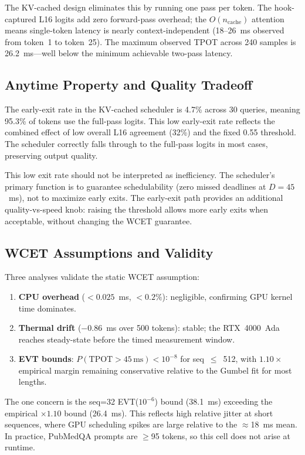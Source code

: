 \documentclass[conference]{IEEEtran}
\begin{document}
The KV-cached design eliminates this by running one pass per token. The hook-captured L16 logits add zero forward-pass overhead; the $O(n_{\text{cache}})$ attention means single-token latency is nearly context-independent (18--26~ms observed from token~1 to token~25). The maximum observed TPOT across 240 samples is 26.2~ms---well below the minimum achievable two-pass latency.

\subsection{Anytime Property and Quality Tradeoff}

The early-exit rate in the KV-cached scheduler is 4.7\% across 30 queries, meaning 95.3\% of tokens use the full-pass logits. This low early-exit rate reflects the combined effect of low overall L16 agreement (32\%) and the fixed 0.55 threshold. The scheduler correctly falls through to the full-pass logits in most cases, preserving output quality.

This low exit rate should not be interpreted as inefficiency. The scheduler's primary function is to guarantee schedulability (zero missed deadlines at $D = 45$~ms), not to maximize early exits. The early-exit path provides an additional quality-vs-speed knob: raising the threshold allows more early exits when acceptable, without changing the WCET guarantee.

\subsection{WCET Assumptions and Validity}

Three analyses validate the static WCET assumption:
\begin{enumerate}[leftmargin=*]
    \item \textbf{CPU overhead} ($<0.025$~ms, $<0.2\%$): negligible, confirming GPU kernel time dominates.
    \item \textbf{Thermal drift} ($-0.86$~ms over 500 tokens): stable; the RTX~4000~Ada reaches steady-state before the timed measurement window.
    \item \textbf{EVT bounds}: $P(\text{TPOT} > 45\,\text{ms}) < 10^{-8}$ for seq~$\leq$~512, with $1.10\times$ empirical margin remaining conservative relative to the Gumbel fit for most lengths.
\end{enumerate}

The one concern is the seq=32 EVT($10^{-6}$) bound (38.1~ms) exceeding the empirical $\times1.10$ bound (26.4~ms). This reflects high relative jitter at short sequences, where GPU scheduling spikes are large relative to the $\approx$18~ms mean. In practice, PubMedQA prompts are $\geq$95 tokens, so this cell does not arise at runtime.
\end{document}
